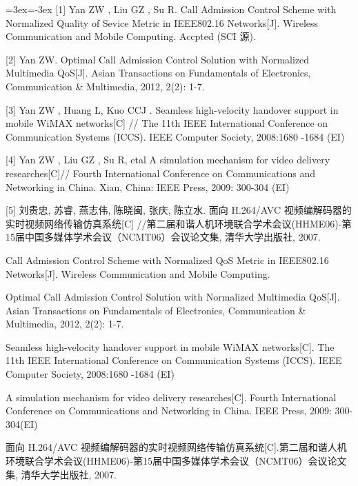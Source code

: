 \documentclass[
    doctor,
    truefont,
    pdflinks,
    ]{xjtuthesis}
\def\authornames{\BlindPeerReviewOFF}
\def\swithON{\BlindPeerReviewOFF}
\def\authornames{\BlindPeerReview}
\def\swithON{\BlindPeerReviewON}
\begin{document}
\ifx\authornames\swithON
{\leftskip=3ex\parindent=-3ex
[1] Yan  ZW , Liu GZ , Su R. Call Admission Control Scheme with Normalized Quality of Sevice Metric in IEEE802.16 Networks[J].  Wireless Communication and Mobile Computing.  Accpted (SCI 源).

[2] Yan ZW. Optimal Call Admission Control Solution with Normalized Multimedia QoS[J]. Asian Transactions on Fundamentals of Electronics, Communication \& Multimedia, 2012, 2(2): 1-7.


[3] Yan ZW ,  Huang L, Kuo CCJ .   Seamless high-velocity handover support in mobile WiMAX networks[C] //  The 11th IEEE  International Conference on Communication Systems (ICCS).  IEEE Computer Society, 2008:1680 -1684 (EI)

[4] Yan  ZW , Liu GZ , Su R, etal  A simulation
mechanism for video delivery researches[C]// Fourth International Conference on Communications and Networking in China. Xian, China: IEEE Press, 2009: 300-304 (EI)

[5] 刘贵忠, 苏睿, 燕志伟, 陈晓闽, 张庆, 陈立水.  面向 H.264/AVC 视频编解码器的实时视频网络传输仿真系统[C] //第二届和谐人机环境联合学术会议(HHME06)-第15届中国多媒体学术会议（NCMT06）会议论文集, 清华大学出版社, 2007.

}
\else
    \begin{enumerate}[{[}1{]}]
    	\item  Call Admission Control Scheme with Normalized QoS Metric
in IEEE802.16 Networks[J].  Wireless Communication and Mobile Computing.
	\item Optimal Call Admission Control Solution with Normalized Multimedia QoS[J]. Asian Transactions on Fundamentals of Electronics, Communication \& 
Multimedia, 2012, 2(2): 1-7.
        \item Seamless high-velocity handover support in mobile
WiMAX networks[C].  The 11th IEEE  International Conference on Communication Systems (ICCS).  IEEE Computer Society, 2008:1680 -1684 (EI)
	\item A simulation
mechanism for video delivery researches[C]. Fourth International Conference on Communications and Networking in China. IEEE Press, 2009: 300-304(EI)
	\item 面向 H.264/AVC 视频编解码器的实时视频网络传输仿真系统[C].第二届和谐人机环境联合学术会议(HHME06)-第15届中国多媒体学术会议（NCMT06）会议论文集, 清华大学出版社, 2007.
    \end{enumerate}
\fi



\xjtuacademicintegrity
\end{document}
